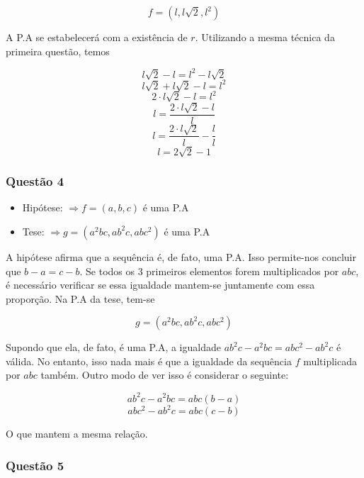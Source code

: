 \documentclass[11pt]{article}
\begin{document}
\begin{tcolorbox}[colback=LightYellow]
\[f = (l, l\sqrt{2}, l^{2})\]
\end{tcolorbox}

A P.A se estabelecerá com a existência de $r$. Utilizando a mesma técnica da primeira questão, temos

\begin{tcolorbox}[colback=LightYellow]
\[l\sqrt{2} - l = l^{2} - l\sqrt{2} \]
\[l\sqrt{2} + l\sqrt{2} - l = l^{2}\]
\[2\cdot l\sqrt{2} - l = l^{2}\]
\[l = \frac{2\cdot l\sqrt{2} - l}{l}\]
\[l = \frac{2\cdot l\sqrt{2}}{l} - \frac{l}{l}\]
\[l = 2\sqrt{2} - 1\]
\end{tcolorbox}

\subsubsection{Questão 4}

\begin{tcolorbox}[colback=LightYellow]
\begin{itemize}
  \item Hipótese: $\Rightarrow f = (a, b, c)$ é uma P.A
  \item Tese: $\Rightarrow g = (a^{2}bc, ab^{2}c, abc^{2})$ é uma P.A
\end{itemize}
\end{tcolorbox}

A hipótese afirma que a sequência é, de fato, uma P.A. Isso permite-nos concluir que $b - a = c - b$. Se todos os 3 primeiros elementos forem multiplicados por $abc$, é necessário verificar se essa igualdade mantem-se juntamente com essa proporção. Na P.A da tese, tem-se

\[g = (a^{2}bc, ab^{2}c, abc^{2})\]

Supondo que ela, de fato, é uma P.A, a igualdade $ab^{2}c - a^{2}bc = abc^{2} - ab^{2}c$ é válida. No entanto, isso nada mais é que a igualdade da sequência $f$ multiplicada por $abc$ também. Outro modo de ver isso é considerar o seguinte:

\begin{tcolorbox}[colback=LightYellow]
\[ab^{2}c - a^{2}bc = abc(b - a)\]
\[abc^{2} - ab^{2}c = abc(c - b)\]
\end{tcolorbox}

O que mantem a mesma relação.

\subsubsection{Questão 5}
\end{document}
